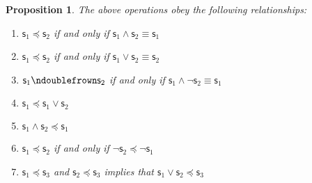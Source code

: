 \documentclass[psamsfonts]{amsart}
\newtheorem{prop}[thm]{Proposition}
\theoremstyle{definition}
\theoremstyle{remark}
\numberwithin{equation}{section}
\def\ncomp{\ndoublefrown}
\def\narrower{\preccurlyeq}
\def\AND{\wedge}
\def\OR{\vee}
\def\NOT{\neg}
\newcommand{\stmt}[1][s] {\mathsf{#1}}
\begin{document}
\begin{prop}\label{prop_narrowness_properties}
	The above operations obey the following relationships:
	\begin{enumerate}
		\item 	$\stmt_1 \narrower \stmt_2$ if and only if $\stmt_1 \AND \stmt_2 \equiv \stmt_1$
		\item 	$\stmt_1 \narrower \stmt_2$ if and only if $\stmt_1 \OR \stmt_2 \equiv \stmt_2$
		\item 	$\stmt_1 \ncomp \stmt_2$ if and only if $\stmt_1 \AND \NOT \stmt_2 \equiv \stmt_1$
		\item 	$\stmt_1 \narrower \stmt_1 \OR \stmt_2$
		\item 	$\stmt_1 \AND \stmt_2 \narrower \stmt_1$
		\item $\stmt_1\narrower\stmt_2$ if and only if $\NOT\stmt_2\narrower\NOT\stmt_1$
		\item $\stmt_1\narrower\stmt_3$ and $\stmt_2\narrower\stmt_3$ implies that $\stmt_1\OR\stmt_2\narrower\stmt_3$
	\end{enumerate}	
\end{prop}
\end{document}
